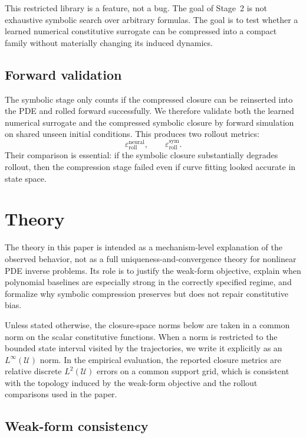 \documentclass[preprint,12pt]{elsarticle}
\begin{document}
This restricted library is a feature, not a bug. The goal of Stage~2 is not exhaustive symbolic search over arbitrary formulas. The goal is to test whether a learned numerical constitutive surrogate can be compressed into a compact family without materially changing its induced dynamics.

\subsection{Forward validation}

The symbolic stage only counts if the compressed closure can be reinserted into the PDE and rolled forward successfully. We therefore validate both the learned numerical surrogate and the compressed symbolic closure by forward simulation on shared unseen initial conditions. This produces two rollout metrics:
\begin{equation}
\varepsilon_{\text{roll}}^{\text{neural}},
\qquad
\varepsilon_{\text{roll}}^{\text{sym}}.
\end{equation}
Their comparison is essential: if the symbolic closure substantially degrades rollout, then the compression stage failed even if curve fitting looked accurate in state space.

\section{Theory}

The theory in this paper is intended as a mechanism-level explanation of the observed behavior, not as a full uniqueness-and-convergence theory for nonlinear PDE inverse problems. Its role is to justify the weak-form objective, explain when polynomial baselines are especially strong in the correctly specified regime, and formalize why symbolic compression preserves but does not repair constitutive bias.

Unless stated otherwise, the closure-space norms below are taken in a common norm on the scalar constitutive functions. When a norm is restricted to the bounded state interval visited by the trajectories, we write it explicitly as an $L^\infty(\mathcal{U})$ norm. In the empirical evaluation, the reported closure metrics are relative discrete $L^2(\mathcal{U})$ errors on a common support grid, which is consistent with the topology induced by the weak-form objective and the rollout comparisons used in the paper.

\subsection{Weak-form consistency}
\end{document}
